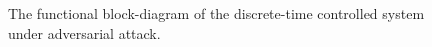 
\begin{figure}[H]
	\centering
	\caption{The functional block-diagram of the discrete-time controlled system under adversarial attack.}
\end{figure}
